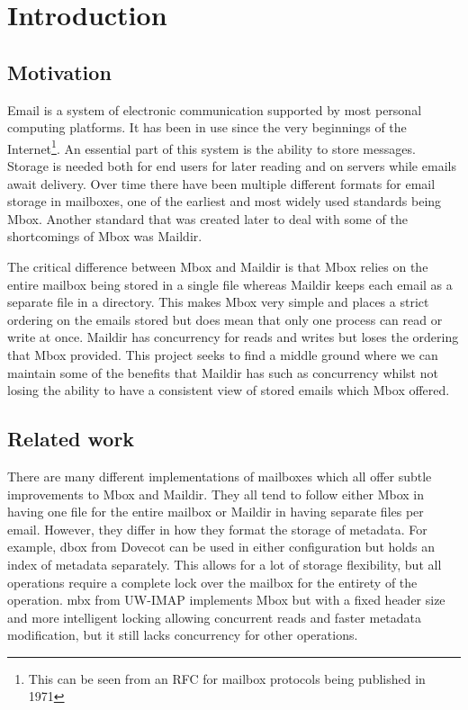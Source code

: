 \chapter{Introduction}

\section{Motivation}

Email is a system of electronic communication supported by most personal computing platforms. It has been in use since the very beginnings of the Internet\footnote{This can be seen from an RFC for mailbox protocols being published in 1971\cite{rfc196}}. An essential part of this system is the ability to store messages. Storage is needed both for end users for later reading and on servers while emails await delivery. Over time there have been multiple different formats for email storage in mailboxes, one of the earliest and most widely used standards being Mbox. Another standard that was created later to deal with some of the shortcomings of Mbox was Maildir.

The critical difference between Mbox and Maildir is that Mbox relies on the entire mailbox being stored in a single file whereas Maildir keeps each email as a separate file in a directory. This makes Mbox very simple and places a strict ordering on the emails stored but does mean that only one process can read or write at once. Maildir has concurrency for reads and writes but loses the ordering that Mbox provided. This project seeks to find a middle ground where we can maintain some of the benefits that Maildir has such as concurrency whilst not losing the ability to have a consistent view of stored emails which Mbox offered.

\section{Related work}

There are many different implementations of mailboxes which all offer subtle improvements to Mbox and Maildir. They all tend to follow either Mbox in having one file for the entire mailbox or Maildir in  having separate files per email. However, they differ in how they format the storage of metadata. For example, dbox from Dovecot can be used in either configuration but holds an index of metadata separately. This allows for a lot of storage flexibility, but all operations require a complete lock over the mailbox for the entirety of the operation. mbx from UW-IMAP implements Mbox but with a fixed header size and more intelligent locking allowing concurrent reads and faster metadata modification, but it still lacks concurrency for other operations.

